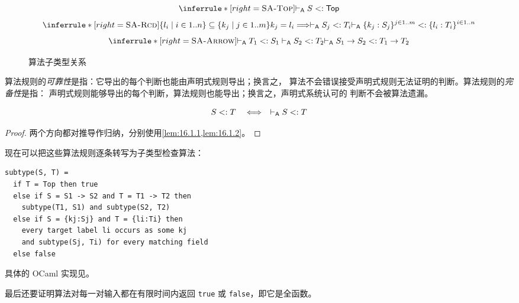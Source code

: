 \begin{figure}[!ht]
\centering
\begin{minipage}{0.98\linewidth}
\small
{}
  {}
\[
\inferrule*[right=\textsc{SA-Top}]
 { }{\algturnstile S\subtype\tapltype{Top}}
\]
\[
\inferrule*[right=\textsc{SA-Rcd}]
 {\{l_i\mid i\in1..n\}\subseteq\{k_j\mid j\in1..m\}\\
  k_j=l_i\Longrightarrow\algturnstile S_j\subtype T_i}
 {\algturnstile\{k_j:S_j\}^{j\in1..m}\subtype
  \{l_i:T_i\}^{i\in1..n}}
\]
\[
\inferrule*[right=\textsc{SA-Arrow}]
 {\algturnstile T_1\subtype S_1\\
  \algturnstile S_2\subtype T_2}
 {\algturnstile S_1\to S_2\subtype T_1\to T_2}
\]
\end{minipage}
\caption{算法子类型关系}
\label{fig:16-2}
\end{figure}
\FloatBarrier

算法规则的\emph{可靠性}是指：它导出的每个判断也能由声明式规则导出；换言之，
算法不会错误接受声明式规则无法证明的判断。算法规则的\emph{完备性}是指：
声明式规则能够导出的每个判断，算法规则也能导出；换言之，声明式系统认可的
判断不会被算法遗漏。

\begin{proposition}[可靠性与完备性]
\label{prop:16.1.5}
\[
  S\mathrel{<:} T
  \quad\Longleftrightarrow\quad
  \mathrel{\vdash_{\mathsf A}} S\mathrel{<:} T
\]
\end{proposition}
\begin{proof}
两个方向都对推导作归纳，分别使用\cref{lem:16.1.1,lem:16.1.2}。
\end{proof}

现在可以把这些算法规则逐条转写为子类型检查算法：
\begin{lstlisting}
subtype(S, T) =
  if T = Top then true
  else if S = S1 -> S2 and T = T1 -> T2 then
    subtype(T1, S1) and subtype(S2, T2)
  else if S = {kj:Sj} and T = {li:Ti} then
    every target label li occurs as some kj
    and subtype(Sj, Ti) for every matching field
  else false
\end{lstlisting}
具体的 OCaml 实现见。

最后还要证明算法对每一对输入都在有限时间内返回 \texttt{true} 或
\texttt{false}，即它是全函数。

